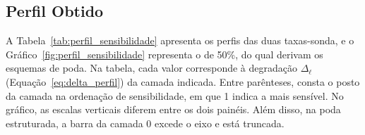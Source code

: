 \subsection{Perfil Obtido}\label{subsec:perfil_obtido}

A Tabela~\ref{tab:perfil_sensibilidade} apresenta os perfis das duas taxas-sonda, e o
Gráfico~\ref{fig:perfil_sensibilidade} representa o de 50\%, do qual derivam os
esquemas de poda. Na tabela, cada valor corresponde à degradação $\Delta_{\ell}$
(Equação~\ref{eq:delta_perfil}) da camada indicada. Entre parênteses, consta o posto da camada
na ordenação de sensibilidade, em que 1 indica a mais sensível. No gráfico, as escalas verticais
diferem entre os dois painéis. Além disso, na poda estruturada, a barra da camada 0 excede o
eixo e está truncada.

\begin{table}[htb]
\centering
\caption{Perfil de sensibilidade por camada do GPT-2 \textit{small} no WikiText-2, nas duas
taxas-sonda.}
\label{tab:perfil_sensibilidade}
\small

\end{table}

